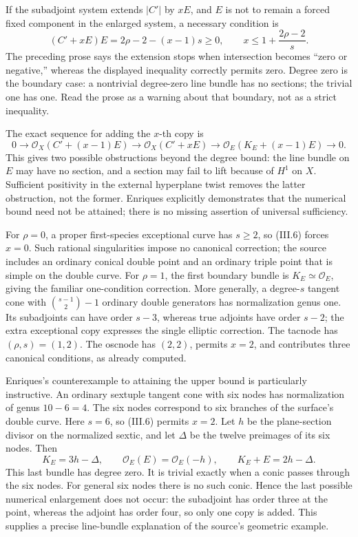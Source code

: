If the subadjoint system extends \(|C'|\) by \(xE\), and \(E\) is not to remain a forced fixed component in the enlarged system, a necessary condition is \[
(C'+xE)E=2\rho-2-(x-1)s\geq0,
\qquad
x\leq1+\frac{2\rho-2}{s}.
\tag{III.6}
\] The preceding prose says the extension stops when intersection becomes ``zero or negative,'' whereas the displayed inequality correctly permits zero. Degree zero is the boundary case: a nontrivial degree-zero line bundle has no sections; the trivial one has one. Read the prose as a warning about that boundary, not as a strict inequality.

The exact sequence for adding the \(x\)-th copy is \[
0\to\mathcal O_X(C'+(x-1)E)
\to\mathcal O_X(C'+xE)
\to\mathcal O_E(K_E+(x-1)E)\to0.
\tag{III.7}
\] This gives two possible obstructions beyond the degree bound: the line bundle on \(E\) may have no section, and a section may fail to lift because of \(H^1\) on \(X\). Sufficient positivity in the external hyperplane twist removes the latter obstruction, not the former. Enriques explicitly demonstrates that the numerical bound need not be attained; there is no missing assertion of universal sufficiency.

For \(\rho=0\), a proper first-species exceptional curve has \(s\geq2\), so (III.6) forces \(x=0\). Such rational singularities impose no canonical correction; the source includes an ordinary conical double point and an ordinary triple point that is simple on the double curve. For \(\rho=1\), the first boundary bundle is \(K_E\simeq\mathcal O_E\), giving the familiar one-condition correction. More generally, a degree-\(s\) tangent cone with \(\binom{s-1}{2}-1\) ordinary double generators has normalization genus one. Its subadjoints can have order \(s-3\), whereas true adjoints have order \(s-2\); the extra exceptional copy expresses the single elliptic correction. The tacnode has \((\rho,s)=(1,2)\). The oscnode has \((2,2)\), permits \(x=2\), and contributes three canonical conditions, as already computed.

Enriques's counterexample to attaining the upper bound is particularly instructive. An ordinary sextuple tangent cone with six nodes has normalization of genus \(10-6=4\). The six nodes correspond to six branches of the surface's double curve. Here \(s=6\), so (III.6) permits \(x=2\). Let \(h\) be the plane-section divisor on the normalized sextic, and let \(\Delta\) be the twelve preimages of its six nodes. Then \[
K_E=3h-\Delta,\qquad
\mathcal O_E(E)=\mathcal O_E(-h),\qquad
K_E+E=2h-\Delta.
\] This last bundle has degree zero. It is trivial exactly when a conic passes through the six nodes. For general six nodes there is no such conic. Hence the last possible numerical enlargement does not occur: the subadjoint has order three at the point, whereas the adjoint has order four, so only one copy is added. This supplies a precise line-bundle explanation of the source's geometric example.

